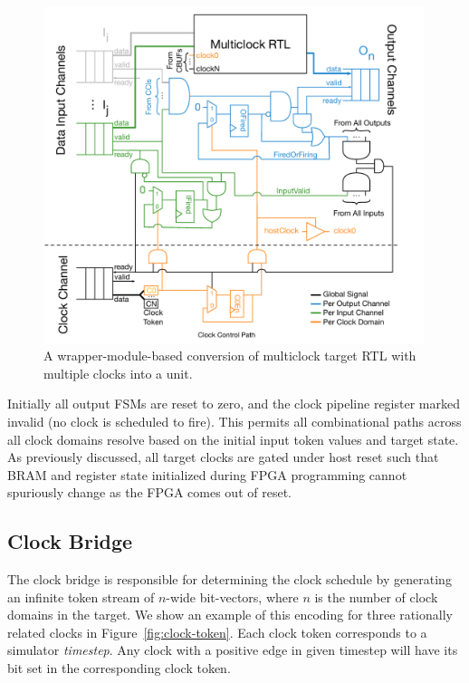 \begin{figure}
    \centering
    \includegraphics[width=0.99\textwidth]{figures/static-multiclock-wrapper.pdf}
    \caption{A wrapper-module-based conversion of multiclock target RTL with multiple clocks into a unit.}
    \label{fig:static-multiclock-wrapper}
\end{figure}


Initially all output FSMs are reset to zero, and the clock pipeline
register marked invalid (no clock is scheduled to fire).  This permits all combinational paths across all clock domains resolve based on the
initial input token values and target state.  As previously discussed, all
target clocks are gated under host reset such that BRAM and register state
initialized during FPGA programming cannot spuriously change as the FPGA comes
out of reset.

\subsection{Clock Bridge}

The clock bridge is responsible for determining the clock schedule by
generating an infinite token stream of $n$-wide bit-vectors, where $n$ is the
number of clock domains in the target. We show an example of this encoding for three rationally
related clocks in Figure~\ref{fig:clock-token}. Each clock token corresponds to a
simulator \emph{timestep}. Any clock with a positive edge in given timestep will have
its bit set in the corresponding clock token.

